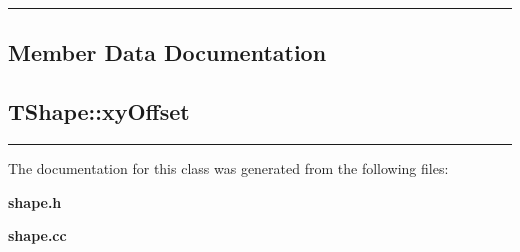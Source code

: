 \vspace{0.4cm}\hrule\vspace{0.2cm}
\subsection*{Member Data Documentation}
\label{TShape_a3}
\subsection{ TShape::xy\-Offset}

\vspace{0.4cm}\hrule\vspace{0.2cm}
The documentation for this class was generated from the following files:\begin{CompactItemize}
\item 
{\bf shape.h}\item 
{\bf shape.cc}\end{CompactItemize}
